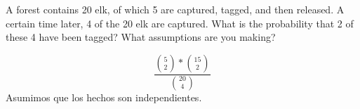 \item A forest contains 20 elk, of which 5 are captured, tagged, and then released. A certain time later, 4 of the 20 elk are captured. What is the probability that 2 of these 4 have been tagged? What assumptions are you making?

\[ \frac{\binom{5}{2} * \binom{15}{2}}{\binom{20}{4}} \]
Asumimos que los hechos son independientes.